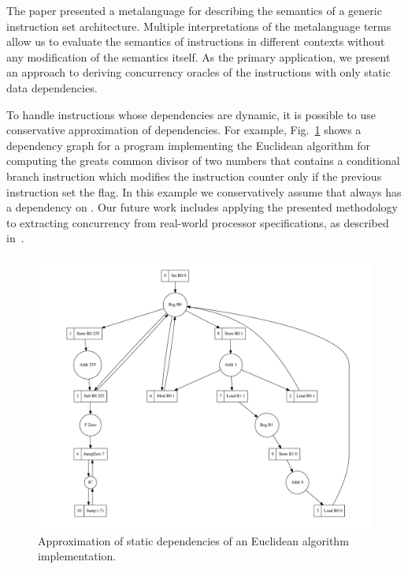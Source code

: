 
The paper presented a metalanguage for describing the semantics of a generic
instruction set architecture.
Multiple interpretations of the metalanguage terms allow us to evaluate the
semantics of instructions in different contexts without any modification of the
semantics itself. As the primary application, we present an approach to deriving
concurrency oracles of the instructions with only static data dependencies.

To handle instructions whose dependencies are dynamic, it is possible to use
conservative approximation of dependencies. For example, Fig.~\ref{fig-sum}
shows a dependency graph for a program  implementing the Euclidean algorithm
for computing the greats common divisor of two numbers that contains
a conditional branch instruction  which modifies the instruction
counter  only if the previous instruction set the  flag. In
this example we conservatively assume that  always has a dependency
on . Our future work includes applying the presented methodology to
extracting concurrency from real-world processor specifications, as described
in~\cite{mokhov2018formal}.

\vspace{-10mm}
\begin{figure}
\centerline{\includegraphics[scale=0.35]{img/gcd.pdf}}
\vspace{-7mm}
\caption{Approximation of static dependencies of an Euclidean algorithm implementation.\label{fig-sum}}
\vspace{-10mm}
\end{figure}
